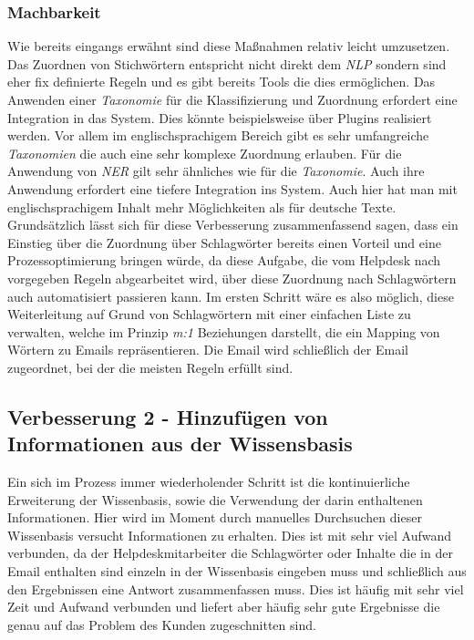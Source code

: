 \subsubsection{Machbarkeit}
Wie bereits eingangs erwähnt sind diese Maßnahmen relativ leicht umzusetzen. Das Zuordnen von Stichwörtern entspricht nicht direkt dem \textit{NLP} sondern sind eher fix definierte Regeln und es gibt bereits Tools die dies ermöglichen. Das Anwenden einer \textit{Taxonomie} für die Klassifizierung und Zuordnung erfordert eine Integration in das System. Dies könnte beispielsweise über Plugins realisiert werden. Vor allem im englischsprachigem Bereich gibt es sehr umfangreiche \textit{Taxonomien} die auch eine sehr komplexe Zuordnung erlauben. Für die Anwendung von \textit{NER} gilt sehr ähnliches wie für die \textit{Taxonomie}. Auch ihre Anwendung erfordert eine tiefere Integration ins System. Auch hier hat man mit englischsprachigem Inhalt mehr Möglichkeiten als für deutsche Texte. Grundsätzlich lässt sich für diese Verbesserung zusammenfassend sagen, dass ein Einstieg über die Zuordnung über Schlagwörter bereits einen Vorteil und eine Prozessoptimierung bringen würde, da diese Aufgabe, die vom Helpdesk nach vorgegeben Regeln abgearbeitet wird, über diese Zuordnung nach Schlagwörtern auch automatisiert passieren kann. Im ersten Schritt wäre es also möglich, diese Weiterleitung auf Grund von Schlagwörtern mit einer einfachen Liste zu verwalten, welche im Prinzip \textit{m:1} Beziehungen darstellt, die ein Mapping von Wörtern zu Emails repräsentieren. Die Email wird schließlich der Email zugeordnet, bei der die meisten Regeln erfüllt sind. 

\subsection{Verbesserung 2 - Hinzufügen von Informationen aus der Wissensbasis}
Ein sich im Prozess immer wiederholender Schritt ist die kontinuierliche Erweiterung der Wissenbasis, sowie die Verwendung der darin enthaltenen Informationen. Hier wird im Moment durch manuelles Durchsuchen dieser Wissenbasis versucht Informationen zu erhalten. Dies ist mit sehr viel Aufwand verbunden, da der Helpdeskmitarbeiter die Schlagwörter oder Inhalte die in der Email enthalten sind einzeln in der Wissenbasis eingeben muss und schließlich aus den Ergebnissen eine Antwort zusammenfassen muss. Dies ist häufig mit sehr viel Zeit und Aufwand verbunden und liefert aber häufig sehr gute Ergebnisse die genau auf das Problem des Kunden zugeschnitten sind. 

